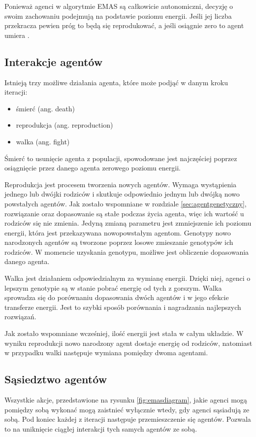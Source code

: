 Ponieważ agenci w algorytmie EMAS są całkowicie autonomiczni, decyzję o swoim zachowaniu podejmują na podstawie poziomu energii. Jeśli jej liczba przekracza pewien próg to będą się reprodukować, a jeśli osiągnie zero to agent umiera \cite{emas3}.


\subsection{Interakcje agentów}
Istnieją trzy możliwe działania agenta, które może podjąć w danym kroku iteracji:
\begin{itemize} 
\item śmierć (ang. death) 
\item reprodukcja (ang. reproduction) 
\item walka (ang. fight) 
\end{itemize}

Śmierć to usunięcie agenta z populacji, spowodowane jest najczęściej poprzez osiągnięcie przez danego agenta zerowego poziomu energii.

Reprodukcja jest procesem tworzenia nowych agentów. Wymaga wystąpienia jednego lub dwójki rodziców i skutkuje odpowiednio jednym lub dwójką nowo powstałych agentów. Jak zostało wspomniane w rozdziale \ref{sec:agentgenetyczny}, rozwiązanie oraz dopasowanie są stałe podczas życia agenta, więc ich wartość u rodziców się nie zmienia. Jedyną zmianą parametru jest zmniejszenie ich poziomu energii, która jest przekazywana nowopowstałym agentom. Genotypy nowo narodzonych agentów są tworzone poprzez losowe zmieszanie genotypów ich rodziców. W momencie uzyskania genotypu, możliwe jest obliczenie dopasowania danego agenta.

Walka jest działaniem odpowiedzialnym za wymianę energii. Dzięki niej, agenci o lepszym genotypie są w stanie pobrać energię od tych z gorszym. Walka sprowadza się do porównaniu dopasowania dwóch agentów i w jego efekcie transferze energii. Jest to szybki sposób porównania i nagradzania najlepszych rozwiązań.

Jak zostało wspomniane wcześniej, ilość energii jest stała w całym układzie. W wyniku reprodukcji nowo narodzony agent dostaje energię od rodziców, natomiast w przypadku walki następuje wymiana pomiędzy dwoma agentami.


\subsection{Sąsiedztwo agentów}
Wszystkie akcje, przedstawione na rysunku \ref{fig:emasdiagram}, jakie agenci mogą pomiędzy sobą wykonać mogą zaistnieć wyłącznie wtedy, gdy agenci sąsiadują ze sobą. Pod koniec każdej z iteracji następuje przemieszczenie się agentów. Pozwala to na uniknięcie ciągłej interakcji tych samych agentów ze sobą.

